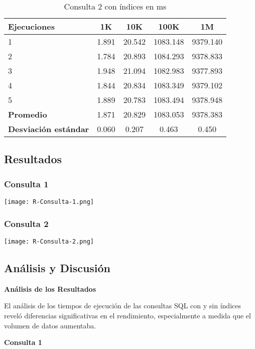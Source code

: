 \documentclass[12pt,a4paper]{article}
\begin{document}
\begin{table}[h!]
\centering
\begin{tabular}{|l|c|c|c|c|}
\hline
\textbf{Ejecuciones} & \textbf{1K} & \textbf{10K} & \textbf{100K} & \textbf{1M} \\
\hline
1 & 1.891 & 20.542 & 1083.148 & 9379.140 \\
2 & 1.784 & 20.893 & 1084.293 & 9378.833 \\
3 & 1.948 & 21.094 & 1082.983 & 9377.893 \\
4 & 1.844 & 20.834 & 1083.349 & 9379.102 \\
5 & 1.889 & 20.783 & 1083.494 & 9378.948 \\
\hline
\textbf{Promedio} & 1.871 & 20.829 & 1083.053 & 9378.383 \\
\textbf{Desviación estándar} & 0.060 & 0.207 & 0.463 & 0.450 \\
\hline
\end{tabular}
\caption{Consulta 2 con índices en ms}
\label{table:consulta2_con_indices}
\end{table}

\subsection{Resultados}
\subsubsection{Consulta 1}
\begin{center}
    \texttt{[image: R-Consulta-1.png]}
\end{center}
\subsubsection{Consulta 2}
\begin{center}
    \texttt{[image: R-Consulta-2.png]}
\end{center}
\subsection{Análisis y Discusión}
\textbf{Análisis de los Resultados}

El análisis de los tiempos de ejecución de las consultas SQL con y sin índices reveló diferencias significativas en el rendimiento, especialmente a medida que el volumen de datos aumentaba.

\textbf{Consulta 1}
\end{document}
